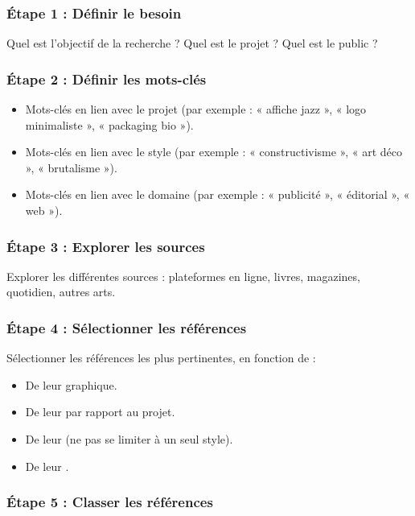 \subsubsection{Étape 1 : Définir le besoin}

Quel est l'objectif de la recherche ? Quel est le projet ? Quel est le public ?

\subsubsection{Étape 2 : Définir les mots-clés}

\begin{itemize}
    \item Mots-clés en lien avec le projet (par exemple : « affiche jazz », « logo minimaliste », « packaging bio »).
    \item Mots-clés en lien avec le style (par exemple : « constructivisme », « art déco », « brutalisme »).
    \item Mots-clés en lien avec le domaine (par exemple : « publicité », « éditorial », « web »).
\end{itemize}

\subsubsection{Étape 3 : Explorer les sources}

Explorer les différentes sources : plateformes en ligne, livres, magazines, quotidien, autres arts.

\subsubsection{Étape 4 : Sélectionner les références}

Sélectionner les références les plus pertinentes, en fonction de :

\begin{itemize}
    \item De leur  graphique.
    \item De leur  par rapport au projet.
    \item De leur  (ne pas se limiter à un seul style).
    \item De leur .
\end{itemize}

\subsubsection{Étape 5 : Classer les références}

